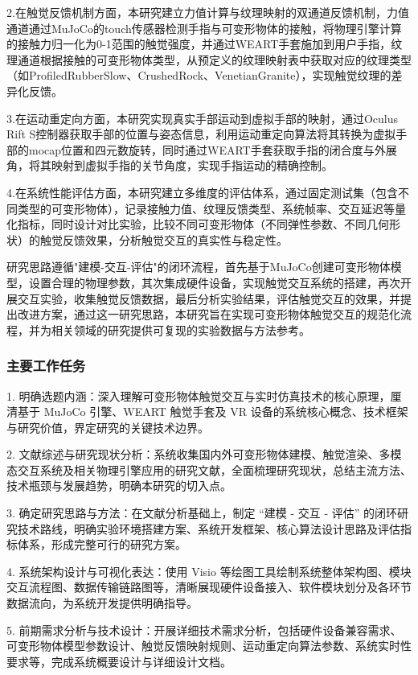 2.在触觉反馈机制方面，本研究建立力值计算与纹理映射的双通道反馈机制，力值通道通过MuJoCo的touch传感器检测手指与可变形物体的接触，将物理引擎计算的接触力归一化为0-1范围的触觉强度，并通过WEART手套施加到用户手指，纹理通道根据接触的可变形物体类型，从预定义的纹理映射表中获取对应的纹理类型（如ProfiledRubberSlow、CrushedRock、VenetianGranite），实现触觉纹理的差异化反馈。

3.在运动重定向方面，本研究实现真实手部运动到虚拟手部的映射，通过Oculus Rift S控制器获取手部的位置与姿态信息，利用运动重定向算法将其转换为虚拟手部的mocap位置和四元数旋转，同时通过WEART手套获取手指的闭合度与外展角，将其映射到虚拟手指的关节角度，实现手指运动的精确控制。

4.在系统性能评估方面，本研究建立多维度的评估体系，通过固定测试集（包含不同类型的可变形物体），记录接触力值、纹理反馈类型、系统帧率、交互延迟等量化指标，同时设计对比实验，比较不同可变形物体（不同弹性参数、不同几何形状）的触觉反馈效果，分析触觉交互的真实性与稳定性。

研究思路遵循"建模-交互-评估"的闭环流程，首先基于MuJoCo创建可变形物体模型，设置合理的物理参数，其次集成硬件设备，实现触觉交互系统的搭建，再次开展交互实验，收集触觉反馈数据，最后分析实验结果，评估触觉交互的效果，并提出改进方案，通过这一研究思路，本研究旨在实现可变形物体触觉交互的规范化流程，并为相关领域的研究提供可复现的实验数据与方法参考。

\subsubsection{主要工作任务}

1. 明确选题内涵：深入理解可变形物体触觉交互与实时仿真技术的核心原理，厘清基于 MuJoCo 引擎、WEART 触觉手套及 VR 设备的系统核心概念、技术框架与研究价值，界定研究的关键技术边界。

2. 文献综述与研究现状分析：系统收集国内外可变形物体建模、触觉渲染、多模态交互系统及相关物理引擎应用的研究文献，全面梳理研究现状，总结主流方法、技术瓶颈与发展趋势，明确本研究的切入点。

3. 确定研究思路与方法：在文献分析基础上，制定 “建模 - 交互 - 评估” 的闭环研究技术路线，明确实验环境搭建方案、系统开发框架、核心算法设计思路及评估指标体系，形成完整可行的研究方案。

4. 系统架构设计与可视化表达：使用 Visio 等绘图工具绘制系统整体架构图、模块交互流程图、数据传输链路图等，清晰展现硬件设备接入、软件模块划分及各环节数据流向，为系统开发提供明确指导。

5. 前期需求分析与技术设计：开展详细技术需求分析，包括硬件设备兼容需求、可变形物体模型参数设计、触觉反馈映射规则、运动重定向算法参数、系统实时性要求等，完成系统概要设计与详细设计文档。

